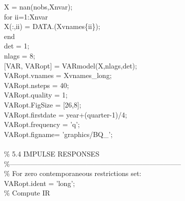\hspace{1mm}X = nan(nobs,Xnvar); \\ 
\hspace{1mm}\textcolor{matlabblue}{for} ii=1:Xnvar \\ 
\hspace{1mm}\hspace{5mm} X(:,ii) = DATA.(Xvnames\{ii\}); \\ 
\hspace{1mm}\textcolor{matlabblue}{end} \\ 
\hspace{1mm}det = 1; \\ 
\hspace{1mm}nlags = 8; \\ 
\hspace{1mm}[VAR, VARopt] = VARmodel(X,nlags,det); \\ 
\hspace{1mm}VARopt.vnames = Xvnames\_long; \\ 
\hspace{1mm}VARopt.nsteps = 40; \\ 
\hspace{1mm}VARopt.quality = 1; \\ 
\hspace{1mm}VARopt.FigSize = [26,8]; \\ 
\hspace{1mm}VARopt.firstdate = year+(quarter-1)/4; \\ 
\hspace{1mm}VARopt.frequency = \textcolor{matlabpurple}{'q'}; \\ 
\hspace{1mm}VARopt.figname= \textcolor{matlabpurple}{'graphics/BQ\_'}; \\ 
\hspace{1mm} \\ 
\hspace{1mm}\textcolor{matlabgreen}{\% 5.4 IMPULSE RESPONSES }\\ 
\hspace{1mm}\textcolor{matlabgreen}{\%--------------------------------------------------------------------------  }\\ 
\hspace{1mm}\textcolor{matlabgreen}{\% For zero contemporaneous restrictions set: }\\ 
\hspace{1mm}VARopt.ident = \textcolor{matlabpurple}{'long'}; \\ 
\hspace{1mm}\textcolor{matlabgreen}{\% Compute IR }\\ 
